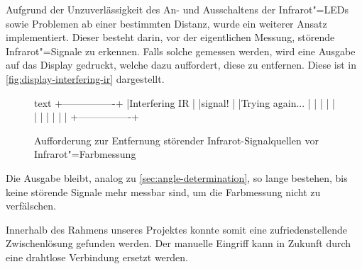 Aufgrund der Unzuverlässigkeit des An- und Ausschaltens der Infrarot"=LEDs sowie Problemen ab einer bestimmten Distanz, wurde ein weiterer Ansatz implementiert. Dieser besteht darin, vor der eigentlichen Messung, störende Infrarot"=Signale zu erkennen. Falls solche gemessen werden, wird eine Ausgabe auf das Display gedruckt, welche dazu auffordert, diese zu entfernen. Diese ist in \autoref{fig:display-interfering-ir} dargestellt.

\begin{figure}[h]
\centering
\begin{cminted}{text}
+----------------+
|Interfering IR  |
|signal!         |
|Trying again... |
|                |
|                |
|                |
|                |
|                |
+----------------+
\end{cminted}
\caption{Aufforderung zur Entfernung störender Infra\-rot-Signal\-quellen vor Infrarot"=Farbmessung}
\label{fig:display-interfering-ir}
\end{figure}

Die Ausgabe bleibt, analog zu \autoref{sec:angle-determination}, so lange bestehen, bis keine störende Signale mehr messbar sind, um die Farbmessung nicht zu verfälschen.

Innerhalb des Rahmens unseres Projektes konnte somit eine zufriedenstellende Zwischenlösung gefunden werden. Der manuelle Eingriff kann in Zukunft durch eine drahtlose Verbindung ersetzt werden.
